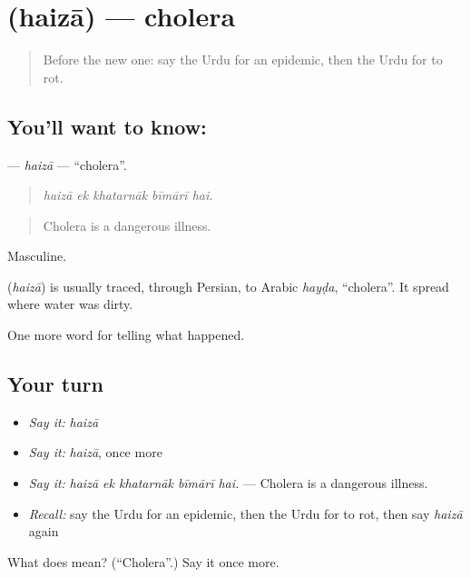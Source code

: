 \section[\texorpdfstring{\ur{ہیضہ} (haizā)}{ہیضہ (haizā)}]{ (haizā) — cholera}

\label{lesson:UR-C294-haiza}



\begin{quote}
Before the new one: say the Urdu for an epidemic, then the Urdu for to rot.
\end{quote}

\subsection*{You'll want to know: }
\textbf{} — \emph{haizā} — \textquotedblleft{}cholera\textquotedblright{}.

\begin{quote}
    
\end{quote}

\begin{quote}
\emph{haizā ek khatarnāk bīmārī hai.}
\end{quote}

\begin{quote}
Cholera is a dangerous illness.
\end{quote}

Masculine.

\begin{cousinweb}
\textbf{} (\emph{haizā}) is usually traced, through Persian, to Arabic \emph{hayḍa}, \textquotedblleft{}cholera\textquotedblright{}. It spread where water was dirty.
\end{cousinweb}

\begin{grammarlens}[title={What you've built}]
One more word for telling what happened.
\end{grammarlens}

\subsection*{Your turn}
\begin{itemize}
\raggedright
  \item \emph{Say it:} \emph{haizā}
  \item \emph{Say it:} \emph{haizā}, once more
  \item \emph{Say it:} \emph{haizā ek khatarnāk bīmārī hai.} — Cholera is a dangerous illness.
  \item \emph{Recall:} say the Urdu for an epidemic, then the Urdu for to rot, then say \emph{haizā} again
\end{itemize}

\begin{tcolorbox}[breakable,colback=teal!4,colframe=teal!35!black,title={Before you move on}]
What does  mean? (\textquotedblleft{}Cholera\textquotedblright{}.) Say it once more.
\end{tcolorbox}
